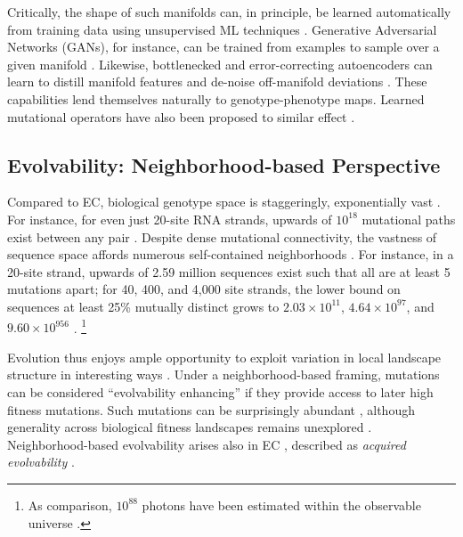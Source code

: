 Critically, the shape of such manifolds can, in principle, be learned automatically from training data using unsupervised ML techniques \citep{radford2015unsupervised,turk1991eigenface,white2016sampling,frowd2004evofit}.
Generative Adversarial Networks (GANs), for instance, can be trained from examples to sample over a given manifold \citep{goodfellow2014generative}.
Likewise, bottlenecked and error-correcting autoencoders can learn to distill manifold features and de-noise off-manifold deviations \citep{hinton2006reducing,vincent2008extracting}.
These capabilities lend themselves naturally to genotype-phenotype maps.
Learned mutational operators have also been proposed to similar effect \citep{lehman2023evolution,meyerson2024language}.

\subsection{Evolvability: Neighborhood-based Perspective}

Compared to EC, biological genotype space is staggeringly, exponentially vast \citep{stadler2007fitness,de2014empirical}.
For instance, for even just 20-site RNA strands, upwards of $10^{18}$ mutational paths exist between any pair \citep{greenbury2022structure}.
Despite dense mutational connectivity, the vastness of sequence space affords numerous self-contained neighborhoods \citep{wagner2017information}.
For instance, in a 20-site strand, upwards of 2.59 million sequences exist such that all are at least 5 mutations apart; for 40, 400, and 4,000 site strands, the lower bound on sequences at least 25\% mutually distinct grows to $2.03 \times 10^{11}$, $4.64 \times 10^{97}$, and $9.60 \times 10^{956}$ \citep{gilbert1952comparison,varshamov1957estimate}.
\unskip\footnote{%
As comparison, $10^{88}$ photons have been estimated within the observable universe \citep{dimopoulos1978baryon}.
}

Evolution thus enjoys ample opportunity to exploit variation in local landscape structure in interesting ways \citep{kumawat2024evolution,barnett2025experimental,steinberg2016environmental,gupta2022hostparasite,ferrare2024evolution,pyo2025evolutionary}.
Under a neighborhood-based framing, mutations can be considered ``evolvability enhancing'' if they provide access to later high fitness mutations.
Such mutations can be surprisingly abundant \citep{wagner2023evolvability}, although generality across biological fitness landscapes remains unexplored \citep{ogbunugafor2023mutations}.
Neighborhood-based evolvability arises also in EC \citep{mengistu2016evolvability,doncieux2020novelty,katona2021quality,lehman2016critical,lehman2013evolvability,reisinger2007acquiring,reisinger2006selecting}, described as \textit{acquired evolvability} \citep{reisinger2005towards}.

